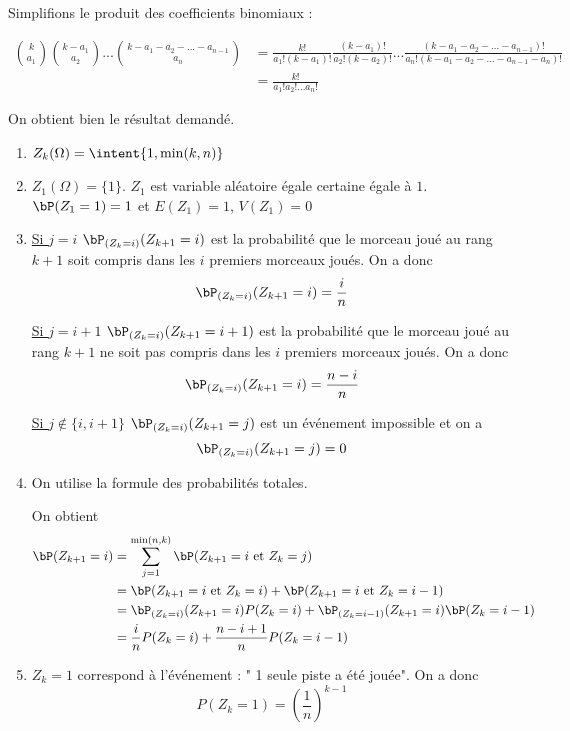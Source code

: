 \begin{correction}
\begin{enumerate}
Simplifions le produit des coefficients binomiaux : 

\begin{align*}
\binom{k}{a_1}\binom{k-a_1}{a_2}...\binom{k-a_1-a_2 -...-a_{n-1}}{a_n} &= 
\frac{k!}{a_1 ! (k-a_1)!} \frac{(k-a_1)!}{a_2 ! (k-a_2)!} ... \frac{(k-a_1-a_2 -...-a_{n-1})!}{a_n ! (k-a_1-a_2 -...-a_{n-1}-a_n)!}\\
&= \frac{k!}{a_1  ! a_2! ... a_n! }
\end{align*}

On obtient bien le résultat demandé. 
\end{enumerate}

\begin{enumerate}
\item $Z_k (\Omega) =\intent{1, \min(k,n)}$
\item $Z_1  (\Omega) =\{1\}$. $Z_1$ est variable aléatoire égale certaine égale à $1$. 
$\bP(Z_1 =1 ) = 1$ et $E(Z_1) = 1$, $V(Z_1) =0$

\item \underline{Si $j=i$}
$\bP_{(Z_k =i)} (Z_{k+1} = i ) $ est la probabilité que le morceau joué au rang $k+1$ soit compris dans les $i$ premiers morceaux joués. On a donc 
$$\bP_{(Z_k =i)} (Z_{k+1} = i )= \frac{i}{n} $$

\underline{Si $j=i+1$}
$\bP_{(Z_k =i)} (Z_{k+1} = i+1 ) $ est la probabilité que le morceau joué au rang $k+1$ ne  soit pas compris dans les $i$ premiers morceaux joués. On a donc 
$$\bP_{(Z_k =i)} (Z_{k+1} = i )= \frac{n-i}{n} $$

\underline{Si $j\notin \{i,i+1\}$}
$\bP_{(Z_k =i)} (Z_{k+1} = j ) $ est un événement impossible et on a 
$$\bP_{(Z_k =i)} (Z_{k+1} = j ) =0$$

\item On utilise la formule des probabilités totales. 

On obtient 
\begin{align*}
\bP(Z_{k+1} = i ) &= \sum_{j=1}^{\min(n,k)} \bP( Z_{k+1} = i  \text{ et }  Z_k = j)\\
						&= \bP( Z_{k+1} = i  \text{ et }  Z_k = i) +\bP( Z_{k+1} = i  \text{ et }  Z_k = i-1)\\
						&= \bP_{( Z_k = i)}( Z_{k+1} = i  ) P( Z_k = i) +\bP_{( Z_k = i-1)}( Z_{k+1} = i ) \bP(Z_k = i-1)\\
						&= \frac{i}{n} P(Z_k =i ) + \frac{n-i+1}{n} P(Z_k =i-1)	
\end{align*}
\item $Z_k=1$ correspond à l'événement : " 1 seule piste a été jouée". On a donc 
$$P(Z_k = 1) =(\frac{1}{n})^{k-1}$$


\end{enumerate}
\end{correction}

